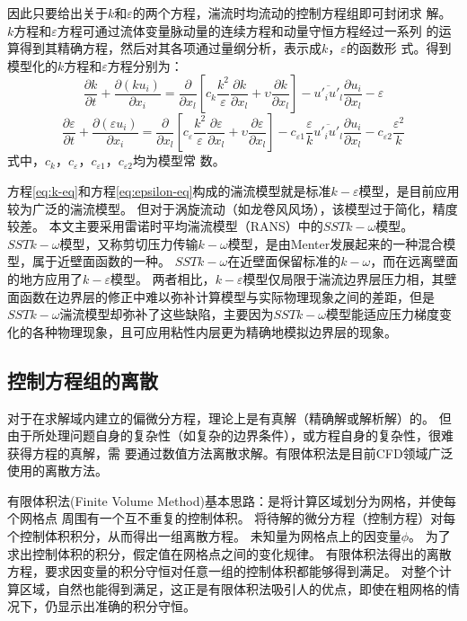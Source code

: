因此只要给出关于$k$和$\varepsilon$的两个方程，湍流时均流动的控制方程组即可封闭求
解。
$k$方程和$\varepsilon$方程可通过流体变量脉动量的连续方程和动量守恒方程经过一系列
的运算得到其精确方程，然后对其各项通过量纲分析，表示成$k$，$\varepsilon$的函数形
式。得到模型化的$k$方程和$\varepsilon$方程分别为\cite{wang2004cfd}\cite{chen1989turbulence}：
\begin{equation}
  \label{eq:k-eq}
  \frac{{\partial k}}{{\partial t}} + \frac{{\partial \left( {k{u_i}} \right)}}{{\partial {x_i}}} =
    \frac{\partial }{{\partial {x_l}}}\left[ {{c_k}\frac{{{k^2}}}{\varepsilon }\frac{{\partial k}}{{\partial {x_l}}} +\upsilon \frac{{\partial k}}{{\partial {x_l}}}} \right] - \overline {{{u'}_i}{{u'}_l}} \frac{{\partial {u_i}}}{{\partial {x_l}}} - \varepsilon
\end{equation}
\begin{equation}
  \label{eq:epsilon-eq}
  \frac{{\partial \varepsilon }}{{\partial t}} + \frac{{\partial \left( {\varepsilon {u_i}} \right)}}{{\partial {x_i}}} =
    \frac{\partial }{{\partial {x_l}}}\left[ {{c_\varepsilon }\frac{{{k^2}}}{\varepsilon }\frac{{\partial \varepsilon }}{{\partial {x_l}}} +
        \upsilon \frac{{\partial \varepsilon }}{{\partial {x_l}}}} \right] -
    {c_{\varepsilon 1}}\frac{\varepsilon }{k}\overline {{{u'}_i}{{u'}_l}} \frac{{\partial {u_i}}}{{\partial {x_l}}} -
    {c_{\varepsilon 2}}\frac{{{\varepsilon ^2}}}{k}
\end{equation}
式中，$c_k$，$c_\varepsilon$，$c_{\varepsilon 1}$，$c_{\varepsilon 2}$均为模型常
数。

方程\eqref{eq:k-eq}和方程\eqref{eq:epsilon-eq}构成的湍流模型就是标准$k-\varepsilon$模型，是目前应用较为广泛的湍流模型。
但对于涡旋流动（如龙卷风风场），该模型过于简化，精度较差。
本文主要采用雷诺时平均湍流模型（RANS）中的$SST k-\omega$模型。
$SST k-\omega$模型，又称剪切压力传输$k-\omega$模型，是由Menter\cite{menter1993zonal}发展起来的一种混合模型，属于近壁面函数的一种。
$SST k-\omega$在近壁面保留标准的$k-\omega$，而在远离壁面的地方应用了$k-\varepsilon$模型。
两者相比，$k-\varepsilon$模型仅局限于湍流边界层压力相，其壁面函数在边界层的修正中难以弥补计算模型与实际物理现象之间的差距，但是$SST k-\omega$湍流模型却弥补了这些缺陷，主要因为$SST k-\omega$模型能适应压力梯度变化的各种物理现象，且可应用粘性内层更为精确地模拟边界层的现象。


\subsection{控制方程组的离散}
对于在求解域内建立的偏微分方程，理论上是有真解（精确解或解析解）的。
但由于所处理问题自身的复杂性（如复杂的边界条件），或方程自身的复杂性，很难获得方程的真解，需
要通过数值方法离散求解。有限体积法是目前CFD领域广泛使用的离散方法。

有限体积法(Finite Volume Method)基本思路：是将计算区域划分为网格，并使每个网格点
周围有一个互不重复的控制体积。
将待解的微分方程（控制方程）对每个控制体积积分，从而得出一组离散方程。
未知量为网格点上的因变量$\phi$。
为了求出控制体积的积分，假定值在网格点之间的变化规律。
有限体积法得出的离散方程，要求因变量的积分守恒对任意一组的控制体积都能够得到满足。
对整个计算区域，自然也能得到满足，这正是有限体积法吸引人的优点，即使在粗网格的情
况下，仍显示出准确的积分守恒。

